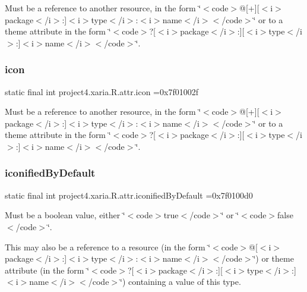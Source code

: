 Must be a reference to another resource, in the form \char`\"{}$<$code$>$@\mbox{[}+\mbox{]}\mbox{[}$<$i$>$package$<$/i$>$\+:\mbox{]}$<$i$>$type$<$/i$>$\+:$<$i$>$name$<$/i$>$$<$/code$>$\char`\"{} or to a theme attribute in the form \char`\"{}$<$code$>$?\mbox{[}$<$i$>$package$<$/i$>$\+:\mbox{]}\mbox{[}$<$i$>$type$<$/i$>$\+:\mbox{]}$<$i$>$name$<$/i$>$$<$/code$>$\char`\"{}. \mbox{\label{classproject4_1_1xaria_1_1R_1_1attr_a1a7b0f39b0d5d71310ab388b7e9fc6aa}} 
\subsubsection{\texorpdfstring{icon}{icon}}
{\footnotesize\ttfamily static final int project4.\+xaria.\+R.\+attr.\+icon =0x7f01002f\hspace{0.3cm}{\ttfamily [static]}}

Must be a reference to another resource, in the form \char`\"{}$<$code$>$@\mbox{[}+\mbox{]}\mbox{[}$<$i$>$package$<$/i$>$\+:\mbox{]}$<$i$>$type$<$/i$>$\+:$<$i$>$name$<$/i$>$$<$/code$>$\char`\"{} or to a theme attribute in the form \char`\"{}$<$code$>$?\mbox{[}$<$i$>$package$<$/i$>$\+:\mbox{]}\mbox{[}$<$i$>$type$<$/i$>$\+:\mbox{]}$<$i$>$name$<$/i$>$$<$/code$>$\char`\"{}. \mbox{\label{classproject4_1_1xaria_1_1R_1_1attr_afd23075fa4e8e9cf0cffd07885e4f10b}} 
\subsubsection{\texorpdfstring{iconified\+By\+Default}{iconifiedByDefault}}
{\footnotesize\ttfamily static final int project4.\+xaria.\+R.\+attr.\+iconified\+By\+Default =0x7f0100d0\hspace{0.3cm}{\ttfamily [static]}}

Must be a boolean value, either \char`\"{}$<$code$>$true$<$/code$>$\char`\"{} or \char`\"{}$<$code$>$false$<$/code$>$\char`\"{}. 

This may also be a reference to a resource (in the form \char`\"{}$<$code$>$@\mbox{[}$<$i$>$package$<$/i$>$\+:\mbox{]}$<$i$>$type$<$/i$>$\+:$<$i$>$name$<$/i$>$$<$/code$>$\char`\"{}) or theme attribute (in the form \char`\"{}$<$code$>$?\mbox{[}$<$i$>$package$<$/i$>$\+:\mbox{]}\mbox{[}$<$i$>$type$<$/i$>$\+:\mbox{]}$<$i$>$name$<$/i$>$$<$/code$>$\char`\"{}) containing a value of this type. \mbox{\label{classproject4_1_1xaria_1_1R_1_1attr_a83227495ab81e78c9d329a52fba6405d}} 
